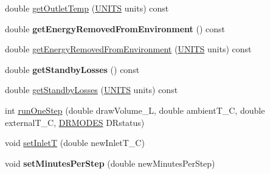 \begin{DoxyCompactItemize}
\item 
double \hyperlink{class_h_p_w_h_a0b75a215e395f52d60997f9b07d37de7}{get\-Outlet\-Temp} (\hyperlink{class_h_p_w_h_a145320dbf116b9245ac4421026cff294}{U\-N\-I\-T\-S} units) const 
\item 
\hypertarget{class_h_p_w_h_a4ee36fec9eb6e1294ad200aeca2da87f}{double {\bfseries get\-Energy\-Removed\-From\-Environment} () const }\label{class_h_p_w_h_a4ee36fec9eb6e1294ad200aeca2da87f}

\item 
double \hyperlink{class_h_p_w_h_af58e48e9103fbb5525a251744816cc77}{get\-Energy\-Removed\-From\-Environment} (\hyperlink{class_h_p_w_h_a145320dbf116b9245ac4421026cff294}{U\-N\-I\-T\-S} units) const 
\item 
\hypertarget{class_h_p_w_h_ae615d088a390d0e1db95a196406ba2b4}{double {\bfseries get\-Standby\-Losses} () const }\label{class_h_p_w_h_ae615d088a390d0e1db95a196406ba2b4}

\item 
double \hyperlink{class_h_p_w_h_a5cccd4667bf976b0a6c1d33ce5fec880}{get\-Standby\-Losses} (\hyperlink{class_h_p_w_h_a145320dbf116b9245ac4421026cff294}{U\-N\-I\-T\-S} units) const 
\item 
int \hyperlink{class_h_p_w_h_a68a687d987105c10a17bac1a94be5224}{run\-One\-Step} (double draw\-Volume\-\_\-\-L, double ambient\-T\-\_\-\-C, double external\-T\-\_\-\-C, \hyperlink{class_h_p_w_h_a6a74814715ed6a33a75fd0d9dc3e7107}{D\-R\-M\-O\-D\-E\-S} D\-Rstatus)
\item 
void \hyperlink{class_h_p_w_h_a5df4fd4422ba54080f519aaf6375be32}{set\-Inlet\-T} (double new\-Inlet\-T\-\_\-\-C)
\item 
\hypertarget{class_h_p_w_h_a5752aa0b3488189c7321c174887f1c31}{void {\bfseries set\-Minutes\-Per\-Step} (double new\-Minutes\-Per\-Step)}\label{class_h_p_w_h_a5752aa0b3488189c7321c174887f1c31}

\end{DoxyCompactItemize}
